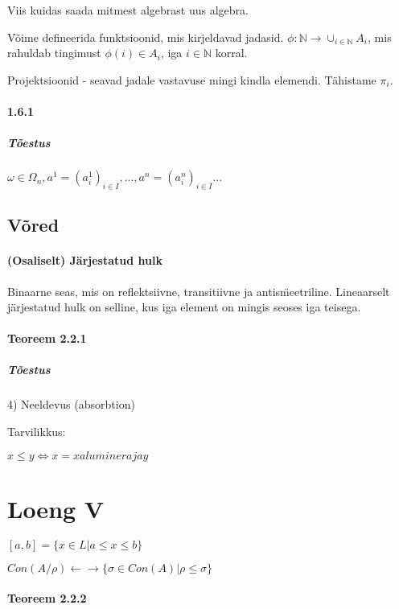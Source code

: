 \documentclass[12pt]{article}
\begin{document}
Viis kuidas saada mitmest algebrast uus algebra.

Võime defineerida funktsioonid, mis kirjeldavad jadasid. $ \phi : \mathbb{N} \rightarrow \cup_{i \in \mathbb{N}} A_i$, mis rahuldab tingimust $ \phi (i) \in A_i$, iga $i \in \mathbb{N}$ korral.

Projektsioonid - seavad jadale vastavuse mingi kindla elemendi. Tähistame $\pi _ i$. 

\paragraph{ 1.6.1}

\subparagraph{Tõestus}
$\omega \in \Omega_n, a^1 = (a_i^1)_{i \in I},..., a^n = (a_i^n)_{i \in I} ...$ 

\subsection{Võred}

\paragraph{(Osaliselt) Järjestatud hulk} 

Binaarne seas, mis on reflektsiivne, transitiivne ja antis\"meetriline. Lineaarselt järjestatud hulk on selline, kus iga element on mingis seoses iga teisega.

\paragraph{Teoreem 2.2.1}

\subparagraph{Tõestus}

4) Neeldevus (absorbtion)

Tarvilikkus:

$x \leq y \iff x = x alumineraja y$

\section{Loeng V}

$[a,b] = \{x \in L | a \leq x \leq b \}$

$Con(A/\rho) \leftarrow \rightarrow \{\sigma \in Con(A) | \rho \leq \sigma \}$

\paragraph{Teoreem 2.2.2}
\end{document}
